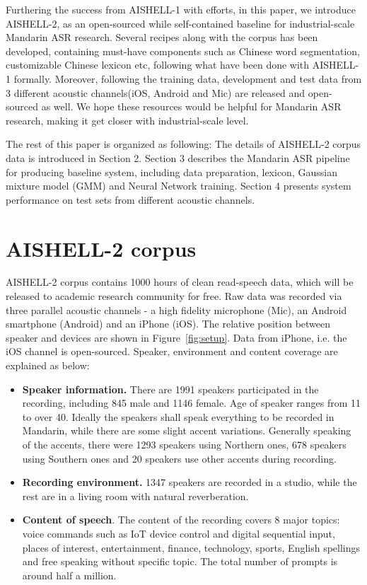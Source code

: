 \documentclass[a4paper]{article}
\begin{document}
Furthering the success from AISHELL-1 with efforts, in this paper, we introduce AISHELL-2, as an open-sourced while self-contained baseline for industrial-scale Mandarin ASR research. 
Several recipes along with the corpus has been developed, containing must-have components such as Chinese word segmentation, 
customizable Chinese lexicon etc, following what have been done with AISHELL-1 formally.
Moreover, following the training data, development and test data from 3 different acoustic channels(iOS, Android and Mic) are released and open-sourced as well.
We hope these resources would be helpful for Mandarin ASR research, making it get closer with industrial-scale level.

The rest of this paper is organized as following: The details of AISHELL-2 corpus data is introduced in Section 2.
Section 3 describes the Mandarin ASR pipeline for producing baseline system, including data preparation, lexicon, Gaussian mixture model (GMM) and Neural Network training.
Section 4 presents system performance on test sets from different acoustic channels.

\section{AISHELL-2 corpus}

AISHELL-2 corpus contains 1000 hours of clean read-speech data, which will be released to academic research community for free. Raw data was recorded via three parallel acoustic channels - a high fidelity microphone (Mic), an Android smartphone (Android) and an iPhone (iOS). The relative position between speaker and devices are shown in Figure~\ref{fig:setup}. Data from iPhone, i.e. the iOS channel is open-sourced. Speaker, environment and content coverage are explained as below:
\begin{itemize}
\item \textbf{Speaker information.} There are 1991 speakers participated in the recording, including 845 male and 1146 female. Age of speaker ranges from 11 to over 40. Ideally the speakers shall speak everything to be recorded in Mandarin, while there are some slight accent variations. Generally speaking of the accents, there were 1293 speakers using Northern ones, 678 speakers using Southern ones and 20 speakers use other accents during recording. 
\item \textbf{Recording environment.} 1347 speakers are recorded in a studio, while the rest are in a living room with natural reverberation.
\item \textbf{Content of speech}. The content of the recording covers 8 major topics: voice commands such as IoT device control and digital sequential input, places of interest, entertainment, finance, technology, sports, English spellings and free speaking without specific topic. The total number of prompts is around half a million.
\end{itemize}
\end{document}

